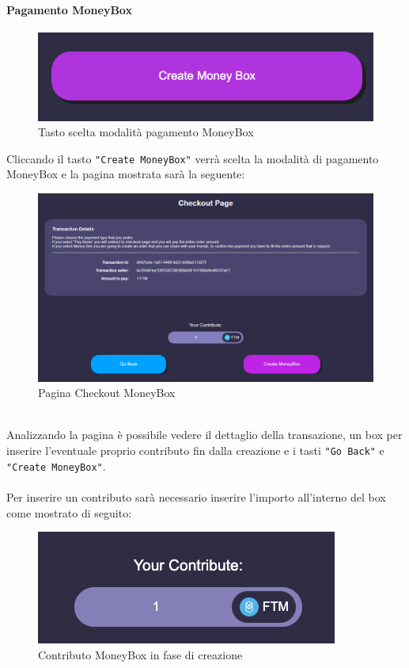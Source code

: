             \paragraph{Pagamento MoneyBox}
            \begin{figure}[H]
                \centering
                \includegraphics[scale=0.3]{immagini/Checkout/CreateMoneyBox.png}
                \caption{Tasto scelta modalità pagamento MoneyBox}
            \end{figure}
            Cliccando il tasto \texttt{"Create MoneyBox"} verrà scelta la modalità di pagamento MoneyBox e la pagina mostrata sarà la seguente:
            \begin{figure}[H]
                \centering
                \includegraphics[scale=0.4]{immagini/Checkout/MoneyBoxCheckout.png}
                \caption{Pagina Checkout MoneyBox}
            \end{figure}
            \textbf{}\\
            Analizzando la pagina è possibile vedere il dettaglio della transazione, un box per inserire l'eventuale proprio contributo fin dalla creazione e i tasti \texttt{"Go Back"} e \texttt{"Create MoneyBox"}.\\\\
            Per inserire un contributo sarà necessario inserire l'importo all'interno del box come mostrato di seguito:
            \begin{figure}[H]
                \centering
                \includegraphics[scale=0.4]{immagini/Checkout/InitialContribute.png}
                \caption{Contributo MoneyBox in fase di creazione}
            \end{figure}
